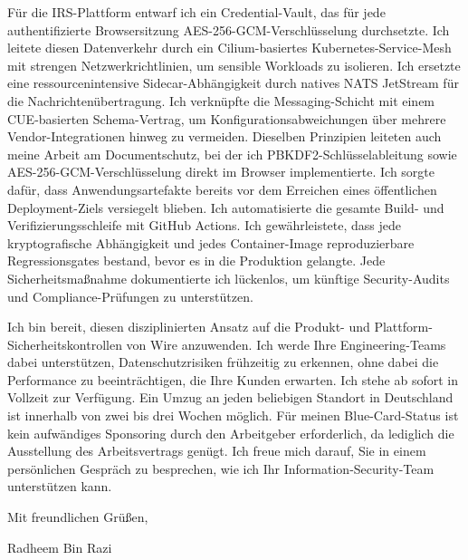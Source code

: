 \documentclass[11pt,a4paper]{coverletter}
\begin{document}
Für die IRS-Plattform entwarf ich ein Credential-Vault, das für jede authentifizierte Browsersitzung AES-256-GCM-Verschlüsselung durchsetzte. Ich leitete diesen Datenverkehr durch ein Cilium-basiertes Kubernetes-Service-Mesh mit strengen Netzwerkrichtlinien, um sensible Workloads zu isolieren. Ich ersetzte eine ressourcenintensive Sidecar-Abhängigkeit durch natives NATS JetStream für die Nachrichtenübertragung. Ich verknüpfte die Messaging-Schicht mit einem CUE-basierten Schema-Vertrag, um Konfigurationsabweichungen über mehrere Vendor-Integrationen hinweg zu vermeiden. Dieselben Prinzipien leiteten auch meine Arbeit am Documentschutz, bei der ich PBKDF2-Schlüsselableitung sowie AES-256-GCM-Verschlüsselung direkt im Browser implementierte. Ich sorgte dafür, dass Anwendungsartefakte bereits vor dem Erreichen eines öffentlichen Deployment-Ziels versiegelt blieben. Ich automatisierte die gesamte Build- und Verifizierungsschleife mit GitHub Actions. Ich gewährleistete, dass jede kryptografische Abhängigkeit und jedes Container-Image reproduzierbare Regressionsgates bestand, bevor es in die Produktion gelangte. Jede Sicherheitsmaßnahme dokumentierte ich lückenlos, um künftige Security-Audits und Compliance-Prüfungen zu unterstützen.

Ich bin bereit, diesen disziplinierten Ansatz auf die Produkt- und Plattform-Sicherheitskontrollen von Wire anzuwenden. Ich werde Ihre Engineering-Teams dabei unterstützen, Datenschutzrisiken frühzeitig zu erkennen, ohne dabei die Performance zu beeinträchtigen, die Ihre Kunden erwarten. Ich stehe ab sofort in Vollzeit zur Verfügung. Ein Umzug an jeden beliebigen Standort in Deutschland ist innerhalb von zwei bis drei Wochen möglich. Für meinen Blue-Card-Status ist kein aufwändiges Sponsoring durch den Arbeitgeber erforderlich, da lediglich die Ausstellung des Arbeitsvertrags genügt. Ich freue mich darauf, Sie in einem persönlichen Gespräch zu besprechen, wie ich Ihr Information-Security-Team unterstützen kann.

\closing{Mit freundlichen Grüßen,}{Radheem Bin Razi}
\end{document}
